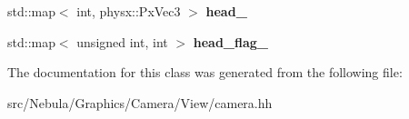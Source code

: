 \begin{DoxyCompactItemize}
\item 
\hypertarget{classneb_1_1camera_1_1camera_ad7207f50c2cfe3402fa57334f7557d03}{std\-::map$<$ int, physx\-::\-Px\-Vec3 $>$ {\bfseries head\-\_\-}}\label{classneb_1_1camera_1_1camera_ad7207f50c2cfe3402fa57334f7557d03}

\item 
\hypertarget{classneb_1_1camera_1_1camera_a011e06042be1b866b098f91ff2413921}{std\-::map$<$ unsigned int, int $>$ {\bfseries head\-\_\-flag\-\_\-}}\label{classneb_1_1camera_1_1camera_a011e06042be1b866b098f91ff2413921}

\end{DoxyCompactItemize}


\-The documentation for this class was generated from the following file\-:\begin{DoxyCompactItemize}
\item 
src/\-Nebula/\-Graphics/\-Camera/\-View/camera.\-hh\end{DoxyCompactItemize}

